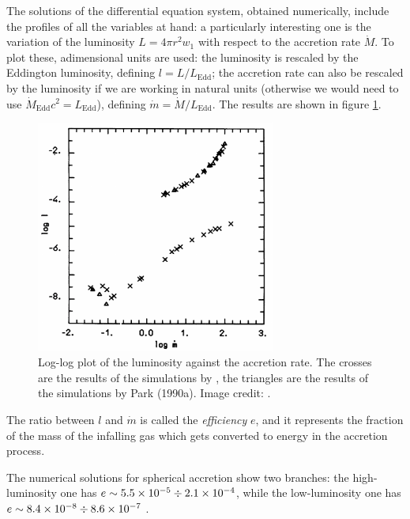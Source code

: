 \documentclass[main.tex]{subfiles}
\begin{document}
The solutions of the differential equation system, obtained numerically, include the profiles of all the variables at hand: a particularly interesting one is the variation of the luminosity \(L = 4 \pi r^2 w_1\) with respect to the accretion rate \(\dot{M}\).
To plot these, adimensional units are used: the luminosity is rescaled by the Eddington luminosity, defining \(l = L / L_{\text{Edd}}\); the accretion rate can also be rescaled by the luminosity if we are working in natural units (otherwise we would need to use \(\dot{M}_{\text{Edd}} c^2 = L_{\text{Edd}}\)), defining \(\dot{m} = \dot{M} / L_{\text{Edd}}\). The results are shown in figure \ref{fig:logl-logm}.

\begin{figure}[ht]
    \centering
    \includegraphics[width=0.7\textwidth]{figures/logl-logm.pdf}
    \caption{Log-log plot of the luminosity against the accretion rate. The crosses are the results of the simulations by \textcite[]{NobiliTurollaZampieri:1991dec}, the triangles are the results of the simulations by Park (1990a). Image credit: \cite[fig. 1]{NobiliTurollaZampieri:1991dec}.}
    \label{fig:logl-logm}
\end{figure}

The ratio between \(l\) and \(\dot{m}\) is called the \emph{efficiency} \(e\), and it represents the fraction of the mass of the infalling gas which gets converted to energy in the accretion process.

The numerical solutions for spherical accretion show two branches: the high-luminosity one has \(e \sim \num{5.5e-5} \divisionsymbol \num{2.1e-4}\), while the low-luminosity one has \(e \sim \num{8.4e-8} \divisionsymbol \num{8.6e-7}\) \cite[tables 1, 2]{NobiliTurollaZampieri:1991dec}.
\end{document}
